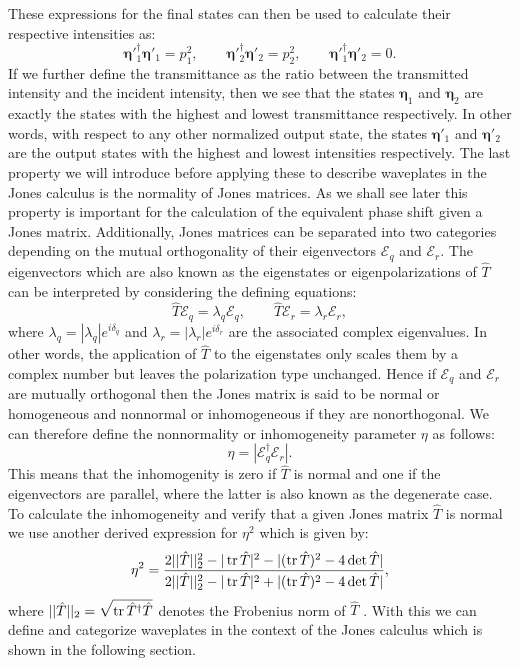 These expressions for the final states can then be used to calculate their respective intensities as:
\begin{equation}
    \bm{\eta}'^{\dagger}_1\bm{\eta}'_1=p_1^2, \qquad 
    \bm{\eta}'^{\dagger}_2\bm{\eta}'_2=p_2^2, \qquad 
    \bm{\eta}'^{\dagger}_1\bm{\eta}'_2=0.
\end{equation}
If we further define the transmittance as the ratio between the transmitted intensity and the incident intensity, then we see that the states $\bm{\eta}_1$ and $\bm{\eta}_2$ are exactly the states with the highest and lowest transmittance respectively. In other words, with respect to any other normalized output state, the states $\bm{\eta}'_1$ and $\bm{\eta}'_2$ are the output states with the highest and lowest intensities respectively. The last property we will introduce before applying these to describe waveplates in the Jones calculus is the normality of Jones matrices. As we shall see later this property is important for the calculation of the equivalent phase shift given a Jones matrix. Additionally, Jones matrices can be separated into two categories depending on the mutual orthogonality of their eigenvectors $\bm{\mathcal{E}}_q$ and $\bm{\mathcal{E}}_r$. The eigenvectors which are also known as the eigenstates or eigenpolarizations of $\hat{T}$ can be interpreted by considering the defining equations:
\begin{equation}
    \hat{T}\bm{\mathcal{E}}_q = \lambda_q\bm{\mathcal{E}}_q, \qquad 
    \hat{T}\bm{\mathcal{E}}_r = \lambda_r\bm{\mathcal{E}}_r,
\end{equation}
where $\lambda_q = |\lambda_q|e^{i\delta_q}$ and $\lambda_r = |\lambda_r|e^{i\delta_r}$ are the associated complex eigenvalues. In other words, the application of $\hat{T}$ to the eigenstates only scales them by a complex number but leaves the polarization type unchanged. Hence if $\bm{\mathcal{E}}_q$ and $\bm{\mathcal{E}}_r$ are mutually orthogonal then the Jones matrix is said to be normal or homogeneous and nonnormal or inhomogeneous if they are nonorthogonal. We can therefore define the nonnormality or inhomogeneity parameter $\eta$ as follows:
\begin{equation}
    \eta=|\bm{\mathcal{E}}^{\dagger}_q \bm{\mathcal{E}}_r|.
\end{equation}
This means that the inhomogenity is zero if $\hat{T}$ is normal and one if the eigenvectors are parallel, where the latter is also known as the degenerate case. To calculate the inhomogeneity and verify that a given Jones matrix $\hat{T}$ is normal we use another derived expression for $\eta^2$ which is given by:
\begin{equation}
    \eta^2 = \frac{2||\hat{T}||_2^2-|\operatorname{tr}\hat{T}|^2-|(\operatorname{tr}\hat{T})^2-4\det\hat{T}|}{2||\hat{T}||_2^2-|\operatorname{tr}\hat{T}|^2+|(\operatorname{tr}\hat{T})^2-4\det\hat{T}|},
\end{equation}
where $||\hat{T}||_2=\sqrt{\operatorname{tr} \hat{T}^{\dagger} \hat{T}}$ denotes the Frobenius norm of $\hat{T}$ \cite{Lu1994HomogeneousMatrices}. With this we can define and categorize waveplates in the context of the Jones calculus which is shown in the following section. 


